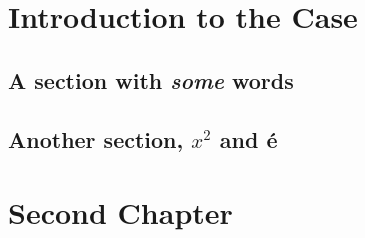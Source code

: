 \documentclass{book}
\begin{document}
\chapter{Introduction to the Case}
\section{A section with \emph{some} words}
\lipsum[1-30]
\section{Another section, $x^2$ and \'e}
\lipsum[31-50]
\chapter{Second Chapter}
\lipsum[1-40]
\end{document}
